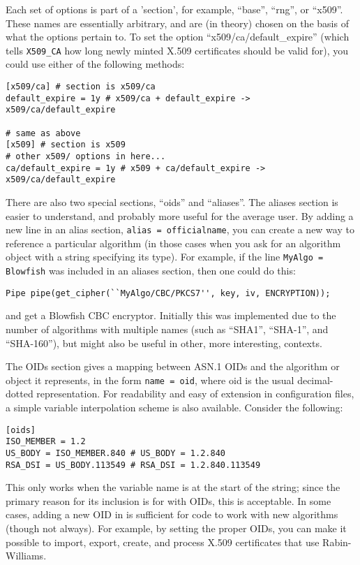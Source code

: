 \documentclass{article}
\newcommand{\type}[1]{\texttt{#1}}
\begin{document}
Each set of options is part of a 'section', for example, ``base'', ``rng'', or
``x509''. These names are essentially arbitrary, and are (in theory) chosen on
the basis of what the options pertain to. To set the option
``x509/ca/default\_expire'' (which tells \type{X509\_CA} how long newly minted
X.509 certificates should be valid for), you could use either of the following
methods:

\begin{verbatim}
[x509/ca] # section is x509/ca
default_expire = 1y # x509/ca + default_expire -> x509/ca/default_expire

# same as above
[x509] # section is x509
# other x509/ options in here...
ca/default_expire = 1y # x509 + ca/default_expire -> x509/ca/default_expire
\end{verbatim}

There are also two special sections, ``oids'' and ``aliases''. The aliases
section is easier to understand, and probably more useful for the average user.
By adding a new line in an alias section, \verb|alias = officialname|, you can
create a new way to reference a particular algorithm (in those cases when you
ask for an algorithm object with a string specifying its type). For example, if
the line \verb|MyAlgo = Blowfish| was included in an aliases section, then one
could do this:

\begin{verbatim}
Pipe pipe(get_cipher(``MyAlgo/CBC/PKCS7'', key, iv, ENCRYPTION));
\end{verbatim}

and get a Blowfish CBC encryptor. Initially this was implemented due to the
number of algorithms with multiple names (such as ``SHA1'', ``SHA-1'', and
``SHA-160''), but might also be useful in other, more interesting, contexts.

The OIDs section gives a mapping between ASN.1 OIDs and the algorithm or object
it represents, in the form \verb|name = oid|, where oid is the usual
decimal-dotted representation. For readability and easy of extension in
configuration files, a simple variable interpolation scheme is also
available. Consider the following:

\begin{verbatim}
[oids]
ISO_MEMBER = 1.2
US_BODY = ISO_MEMBER.840 # US_BODY = 1.2.840
RSA_DSI = US_BODY.113549 # RSA_DSI = 1.2.840.113549
\end{verbatim}

This only works when the variable name is at the start of the string; since the
primary reason for its inclusion is for with OIDs, this is acceptable. In some
cases, adding a new OID in is sufficient for code to work with new algorithms
(though not always). For example, by setting the proper OIDs, you can make it
possible to import, export, create, and process X.509 certificates that use
Rabin-Williams.
\end{document}
